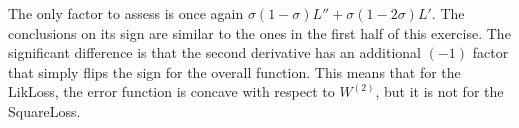 \documentclass[fleqn]{report}
\begin{document}
The only factor to assess is once again $\sigma (1-\sigma) L'' + \sigma (1-2 \sigma) L'$. The conclusions on its sign are similar to the ones in the first half of this exercise. The significant difference is that the second derivative has an additional $(-1)$ factor that simply flips the sign for the overall function. This means that for the LikLoss, the error function is concave with respect to $W^{(2)}$, but it is not for the SquareLoss.
\end{document}
